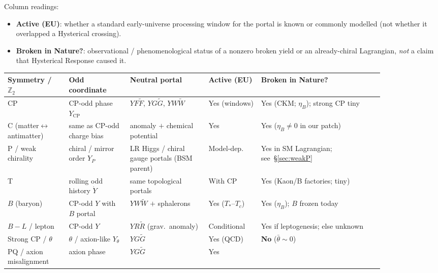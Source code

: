 \documentclass[11pt]{article}
\theoremstyle{definition}
\theoremstyle{remark}
\begin{document}
Column readings:
\begin{itemize}
\item \textbf{Active (EU)}: whether a standard early-universe processing window
for the portal is known or commonly modelled (not whether it overlapped a
Hysterical crossing).
\item \textbf{Broken in Nature?}: observational / phenomenological status of a
nonzero broken yield or an already-chiral Lagrangian, \emph{not} a claim that
Hysterical Response caused it.
\end{itemize}

\begin{table}[htbp]
\centering
\scriptsize
\setlength{\tabcolsep}{3pt}
\begin{tabular}{@{}>{\raggedright\arraybackslash}p{0.14\linewidth}
>{\raggedright\arraybackslash}p{0.14\linewidth}
>{\raggedright\arraybackslash}p{0.18\linewidth}
>{\centering\arraybackslash}p{0.12\linewidth}
>{\raggedright\arraybackslash}p{0.28\linewidth}@{}}
\toprule
\textbf{Symmetry / $\mathbb Z_2$} &
\textbf{Odd coordinate} &
\textbf{Neutral portal} &
\textbf{Active (EU)} &
\textbf{Broken in Nature?}\\
\midrule
CP &
CP-odd phase $Y_{\mathrm{CP}}$ &
$Y F\widetilde F$, $Y G\widetilde G$, $Y W\widetilde W$ &
Yes (windows) &
Yes (CKM; $\eta_B$); strong CP tiny\\
\addlinespace
C (matter$\leftrightarrow$antimatter) &
same as CP-odd charge bias &
anomaly $+$ chemical potential &
Yes &
Yes ($\eta_B\neq0$ in our patch)\\
\addlinespace
P / weak chirality &
chiral / mirror order $Y_P$ &
LR Higgs / chiral gauge portals (BSM parent) &
Model-dep.\ &
Yes in SM Lagrangian; see~\S\ref{sec:weakP}\\
\addlinespace
T &
rolling odd history $\dot Y$ &
same topological portals &
With CP &
Yes (Kaon/B factories; tiny)\\
\addlinespace
$B$ (baryon) &
CP-odd $Y$ with $B$ portal &
$Y W\widetilde W$ $+$ sphalerons &
Yes ($T_*$--$T_c$) &
Yes ($\eta_B$); $B$ frozen today\\
\addlinespace
$B\!-\!L$ / lepton &
CP-odd $Y$ &
$Y R\widetilde R$ (grav.\ anomaly) &
Conditional &
Yes if leptogenesis; else unknown\\
\addlinespace
Strong CP / $\theta$ &
$\theta$ / axion-like $Y_\theta$ &
$Y G\widetilde G$ &
Yes (QCD) &
\textbf{No} ($\bar\theta\sim0$)\\
\addlinespace
PQ / axion misalignment &
axion phase &
$Y G\widetilde G$ &
Yes &

\end{tabular}
\end{table}
\end{document}
